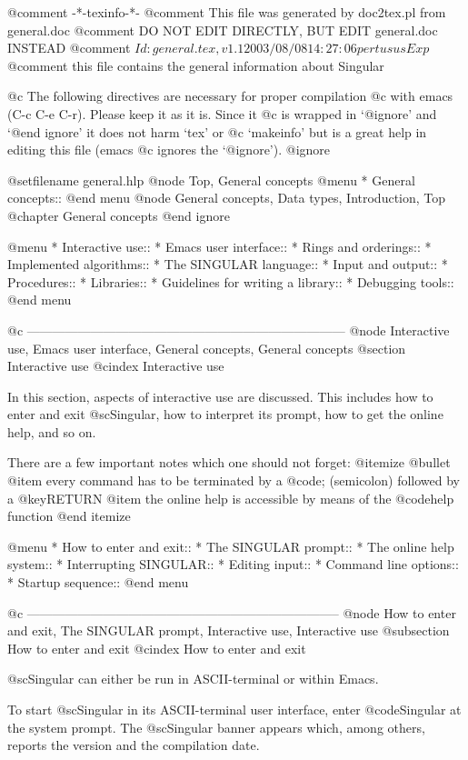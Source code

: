 @comment -*-texinfo-*-
@comment This file was generated by doc2tex.pl from general.doc
@comment DO NOT EDIT DIRECTLY, BUT EDIT general.doc INSTEAD
@comment $Id: general.tex,v 1.1 2003/08/08 14:27:06 pertusus Exp $
@comment this file contains the general information about Singular

@c The following directives are necessary for proper compilation
@c with emacs (C-c C-e C-r).  Please keep it as it is.  Since it
@c is wrapped in `@ignore' and `@end ignore' it does not harm `tex' or
@c `makeinfo' but is a great help in editing this file (emacs
@c ignores the `@ignore').
@ignore

@setfilename general.hlp
@node Top, General concepts
@menu
* General concepts::
@end menu
@node General concepts, Data types, Introduction, Top
@chapter General concepts
@end ignore

@menu
* Interactive use::
* Emacs user interface::
* Rings and orderings::
* Implemented algorithms::
* The SINGULAR language::
* Input and output::
* Procedures::
* Libraries::
* Guidelines for writing a library::
* Debugging tools::
@end menu


@c ---------------------------------------------------------------------------
@node Interactive use, Emacs user interface, General concepts, General concepts
@section Interactive use
@cindex Interactive use

In this section, aspects of interactive use are discussed.  This
includes how to enter and exit @sc{Singular}, how to interpret its
prompt, how to get the online help, and so on.

There are a few important notes which one should not forget:
@itemize @bullet
@item
every command has to be terminated by a @code{;} (semicolon) followed
by a @key{RETURN}
@item
the online help is accessible by means of the @code{help} function
@end itemize

@menu
* How to enter and exit::
* The SINGULAR prompt::
* The online help system::
* Interrupting SINGULAR::
* Editing input::
* Command line options::
* Startup sequence::
@end menu

@c --------------------------------------------------------------------------
@node How to enter and exit, The SINGULAR prompt, Interactive use, Interactive use
@subsection How to enter and exit
@cindex How to enter and exit

@sc{Singular} can either be run in ASCII-terminal or within Emacs.

To start @sc{Singular} in its ASCII-terminal user interface,  enter
@code{Singular} at the system prompt. The
@sc{Singular} banner appears which, among others, reports the version
and the compilation date.

